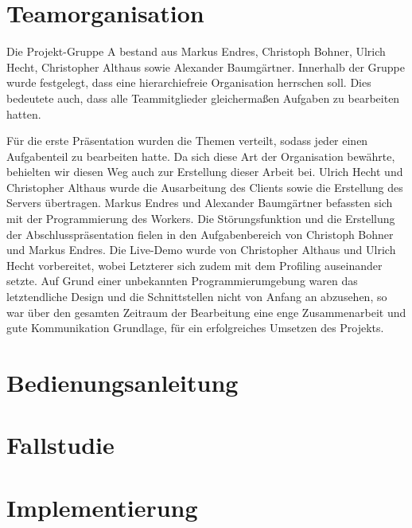 \documentclass[10pt,a4paper]{article}
\begin{document}
\section{Teamorganisation}	%
Die Projekt-Gruppe A bestand aus Markus Endres, Christoph Bohner, Ulrich Hecht, Christopher Althaus sowie Alexander Baumgärtner. Innerhalb der Gruppe wurde festgelegt, dass eine hierarchiefreie Organisation herrschen soll. Dies bedeutete auch, dass alle Teammitglieder gleichermaßen Aufgaben zu bearbeiten hatten. 

Für die erste Präsentation wurden die Themen verteilt, sodass jeder einen Aufgabenteil zu bearbeiten hatte. Da sich diese Art der Organisation bewährte, behielten wir diesen Weg auch zur Erstellung dieser Arbeit bei. Ulrich Hecht und Christopher Althaus wurde die Ausarbeitung des Clients sowie die Erstellung des Servers übertragen. Markus Endres und Alexander Baumgärtner befassten sich mit der Programmierung des Workers. Die Störungsfunktion und die Erstellung der Abschlusspräsentation fielen in den Aufgabenbereich von Christoph Bohner und Markus Endres. Die Live-Demo wurde von Christopher Althaus und Ulrich Hecht vorbereitet, wobei Letzterer sich zudem mit dem Profiling auseinander setzte.  Auf Grund einer unbekannten Programmierumgebung waren das letztendliche Design und die Schnittstellen nicht von Anfang an abzusehen, so war über den gesamten Zeitraum der Bearbeitung eine enge Zusammenarbeit und gute Kommunikation Grundlage, für ein erfolgreiches Umsetzen des Projekts.
\newpage

\section{Bedienungsanleitung}

\section{Fallstudie}

\section{Implementierung}

%

\end{document}
